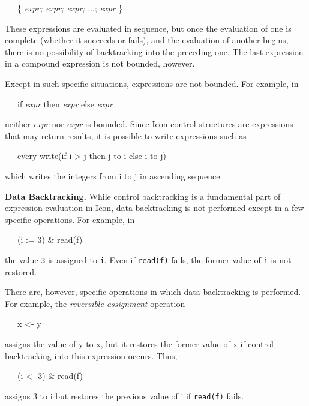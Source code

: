 {\ttfamily\mdseries
\ \ \ \{ \textit{expr}\textit{}\textit{; expr}\textit{}\textit{;
expr}\textit{}\textit{; }...; \textit{expr}\textit{}\textit{ }\}}

These expressions are evaluated in sequence, but once the evaluation
of one is complete (whether it succeeds or fails), and the evaluation
of another begins, there is no possibility of backtracking into the
preceding one. The last expression in a compound expression is not
bounded, however.

Except in such specific situations, expressions are not bounded. For
example, in

{\ttfamily\mdseries
\ \ \ if \textit{expr}\textit{}\textit{ }then \textit{expr}\textit{}\textit{ }else
\textit{expr}\textit{}}

\noindent neither \textit{expr}\textit{} nor
\textit{expr}\textit{} is bounded. Since Icon control
structures are expressions that may return results, it is possible to
write expressions such as

{\ttfamily\mdseries
\ \ \ every write(if i {\textgreater} j then j to i else i to j)}

\noindent
which writes the integers from i to j in ascending sequence.


\textbf{Data Backtracking.} While control backtracking is a
fundamental part of expression evaluation in Icon, data backtracking
is not performed except in a few specific operations. For example, in

{\ttfamily\mdseries
\ \ \ (i := 3) \& read(f)}

\noindent the value \texttt{3} is assigned to \texttt{i}. Even if
\texttt{read(f)} fails, the former value of \texttt{i} is not
restored.

There are, however, specific operations in which data backtracking is
performed. For example, the \textit{reversible assignment} operation

{\ttfamily\mdseries
\ \ \ x {\textless}- y}

\noindent assigns the value of y to x, but it restores the former
value of x if control backtracking into this expression occurs.  Thus,

{\ttfamily\mdseries
\ \ \ (i {\textless}- 3) \& read(f)}

\noindent
assigns 3 to i but restores the previous value of i if \texttt{read(f)} fails.


